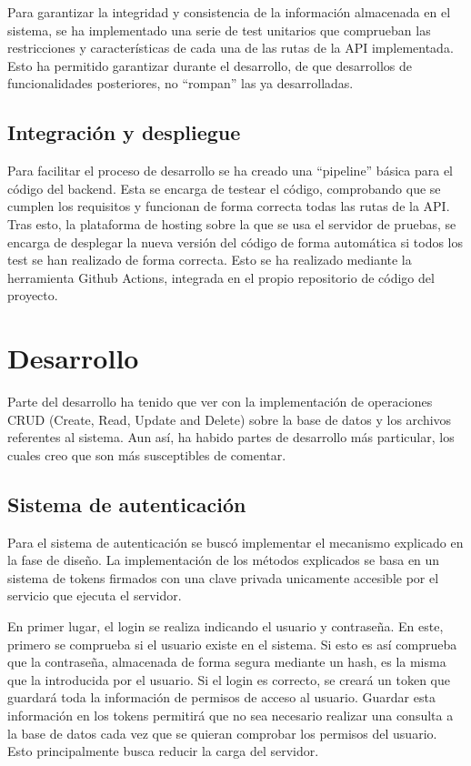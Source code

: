 Para garantizar la integridad y consistencia de la información almacenada en el sistema, se ha implementado una serie de test unitarios que comprueban las restricciones y características de cada una de las rutas de la API implementada. Esto ha permitido garantizar durante el desarrollo, de que desarrollos de funcionalidades posteriores, no ``rompan'' las ya desarrolladas.

\subsection{Integración y despliegue}

Para facilitar el proceso de desarrollo se ha creado una ``pipeline'' básica para el código del backend. Esta se encarga de testear el código, comprobando que se cumplen los requisitos y funcionan de forma correcta todas las rutas de la API. Tras esto, la plataforma de hosting sobre la que se usa el servidor de pruebas, se encarga de desplegar la nueva versión del código de forma automática si todos los test se han realizado de forma correcta. Esto se ha realizado mediante la herramienta Github Actions, integrada en el propio repositorio de código del proyecto.

\section{Desarrollo}

Parte del desarrollo ha tenido que ver con la implementación de operaciones CRUD (Create, Read, Update and Delete) sobre la base de datos y los archivos referentes al sistema. Aun así, ha habido partes de desarrollo más particular, los cuales creo que son más susceptibles de comentar.

\subsection{Sistema de autenticación}

Para el sistema de autenticación se buscó implementar el mecanismo explicado en la fase de diseño. La implementación de los métodos explicados se basa en un sistema de tokens firmados con una clave privada unicamente accesible por el servicio que ejecuta el servidor.

En primer lugar, el login se realiza indicando el usuario y contraseña. En este, primero se comprueba si el usuario existe en el sistema. Si esto es así comprueba que la contraseña, almacenada de forma segura mediante un hash, es la misma que la introducida por el usuario. Si el login es correcto, se creará un token que guardará toda la información de permisos de acceso al usuario. Guardar esta información en los tokens permitirá que no sea necesario realizar una consulta a la base de datos cada vez que se quieran comprobar los permisos del usuario. Esto principalmente busca reducir la carga del servidor.

